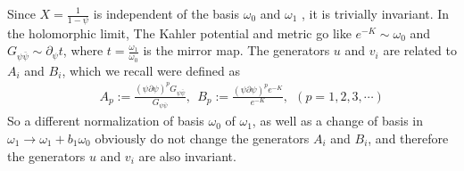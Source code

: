 \documentclass[12pt]{article}
\begin{document}
Since $X=\frac{1}{1-\psi}$ is independent of the basis $\omega_0$
and $\omega_1$ , it is trivially invariant. In the holomorphic
limit, The Kahler potential and metric go like $e^{-K}\sim
\omega_0$ and $G_{\psi\bar{\psi}}\sim
\partial_{\psi}t$, where $t=\frac{\omega_1}{\omega_0}$ is the mirror
map. The generators $u$ and $v_i$ are related to $A_i$ and $B_i$,
which we recall were defined as
\begin{eqnarray} &&A_p:=\frac{(\psi\partial\psi)^p
G_{\psi\bar{\psi}}}{G_{\psi\bar{\psi}}},~~B_p:=\frac{(\psi\partial\psi)^p
e^{-K}}{e^{-K}}, ~~(p=1,2,3,\cdots)
\end{eqnarray}
So a different normalization of basis $\omega_0$ of $\omega_1$, as
well as a change of basis in $\omega_1\rightarrow \omega_1+b_1
\omega_0$ obviously do not change the generators $A_i$ and $B_i$,
and therefore the generators $u$ and $v_i$ are also invariant.
\end{document}

